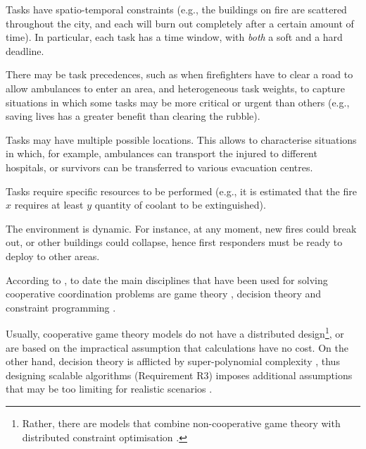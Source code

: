 \begin{description}[style=nextline]
    \item[A1] Tasks have spatio-temporal constraints (e.g., the buildings on fire are
        scattered throughout the city, and each will burn out completely after a certain
        amount of time). In particular, each task has a time window, with \emph{both} a
        soft and a hard deadline.
    \item[A2] There may be task precedences, such as when firefighters have to clear a
        road to allow ambulances to enter an area, and heterogeneous task weights, to
        capture situations in which some tasks may be more critical or urgent than others
        (e.g., saving lives has a greater benefit than clearing the rubble).
    \item[A3] Tasks may have multiple possible locations. This allows to characterise
        situations in which, for example, ambulances can transport the injured to
        different hospitals, or survivors can be transferred to various evacuation
        centres.
    \item[A4] Tasks require specific resources to be performed (e.g., it is estimated that
        the fire $x$ requires at least $y$ quantity of coolant to be extinguished).
    \item[A5] The environment is dynamic. For instance, at any moment, new fires could
        break out, or other buildings could collapse, hence first responders must be ready
        to deploy to other areas.
\end{description}

According to \cite{fioretto2018survey}, to date the main disciplines that have been used
for solving cooperative coordination problems are game theory
\cite{myerson1997,osborne1994}, decision theory \cite{keeney1993} and constraint
programming \cite{dechter2003,rossi2006handbook}.

Usually, cooperative game theory models do not have a distributed design\footnote{Rather,
there are models that combine non-cooperative game theory with distributed constraint
optimisation \cite{chapman2010,chapman2011,chapman2011b,zou2021}.}, or are based on the
impractical assumption that calculations have no cost. On the other hand, decision theory
is afflicted by super-polynomial complexity \cite{bellman2003}, thus designing scalable
algorithms (Requirement R3) imposes additional assumptions that may be too limiting for
realistic scenarios \cite{diederich2001,cerquides2013}.

